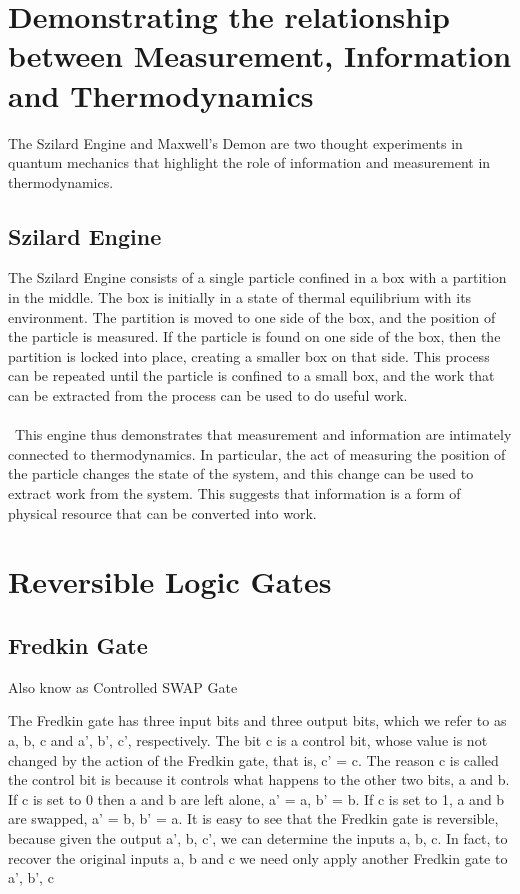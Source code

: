 \documentclass{article}
\begin{document}
\section{Demonstrating the relationship between Measurement, Information and Thermodynamics}

The Szilard Engine and Maxwell's Demon are two thought experiments in quantum mechanics that highlight the role of information and measurement in thermodynamics.
\subsection{Szilard Engine}
The Szilard Engine consists of a single particle confined in a box with a partition in the middle. The box is initially in a state of thermal equilibrium with its environment. The partition is moved to one side of the box, and the position of the particle is measured. If the particle is found on one side of the box, then the partition is locked into place, creating a smaller box on that side. This process can be repeated until the particle is confined to a small box, and the work that can be extracted from the process can be used to do useful work. \\\\\
This engine thus demonstrates that measurement and information are intimately connected to thermodynamics. In particular, the act of measuring the position of the particle changes the state of the system, and this change can be used to extract work from the system. This suggests that information is a form of physical resource that can be converted into work.

\section{Reversible Logic Gates}

\subsection{Fredkin Gate}
Also know as Controlled SWAP Gate

The Fredkin gate has three input bits and three output bits, which we refer to
as a, b, c and a', b', c', respectively. The bit c is a control bit, whose value is not changed by the action of the Fredkin gate, that is, c' = c. The reason c is called the control bit is because it controls what happens to the other two bits, a and b. If c is set to 0 then a and b are left alone, a' = a, b' = b. If c is set to 1, a and b are swapped, a' = b, b' = a. It is easy to see that the Fredkin gate is reversible, because given the output a', b, c', we can determine the inputs a, b, c. In fact, to recover the original inputs a, b and c we need only apply another Fredkin gate to a', b', c
\end{document}
